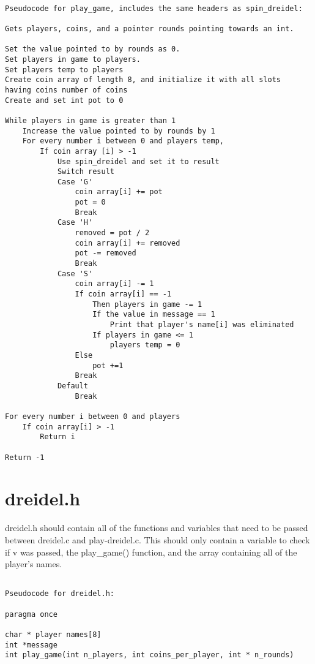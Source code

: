 \documentclass[11pt]{article}
\begin{document}
 \begin{verbatim}

Pseudocode for play_game, includes the same headers as spin_dreidel:

Gets players, coins, and a pointer rounds pointing towards an int.

Set the value pointed to by rounds as 0.
Set players in game to players.
Set players temp to players
Create coin array of length 8, and initialize it with all slots
having coins number of coins
Create and set int pot to 0

While players in game is greater than 1
    Increase the value pointed to by rounds by 1
    For every number i between 0 and players temp,
        If coin array [i] > -1
            Use spin_dreidel and set it to result
            Switch result
            Case 'G'
                coin array[i] += pot
                pot = 0
                Break
            Case 'H'
                removed = pot / 2
                coin array[i] += removed
                pot -= removed
                Break
            Case 'S'
                coin array[i] -= 1
                If coin array[i] == -1
                    Then players in game -= 1
                    If the value in message == 1
                        Print that player's name[i] was eliminated
                    If players in game <= 1
                        players temp = 0
                Else
                    pot +=1
                Break
            Default
                Break

For every number i between 0 and players
    If coin array[i] > -1
        Return i

Return -1

 \end{verbatim}


 \section{dreidel.h}

dreidel.h should contain all of the functions and variables that need to be passed between dreidel.c and play-dreidel.c. This should only contain a variable to check if v was passed, the play\_game() function, and the array containing all of the player's names.

 \begin{verbatim}

Pseudocode for dreidel.h:

paragma once

char * player names[8]
int *message
int play_game(int n_players, int coins_per_player, int * n_rounds)

 \end{verbatim}
\end{document}
